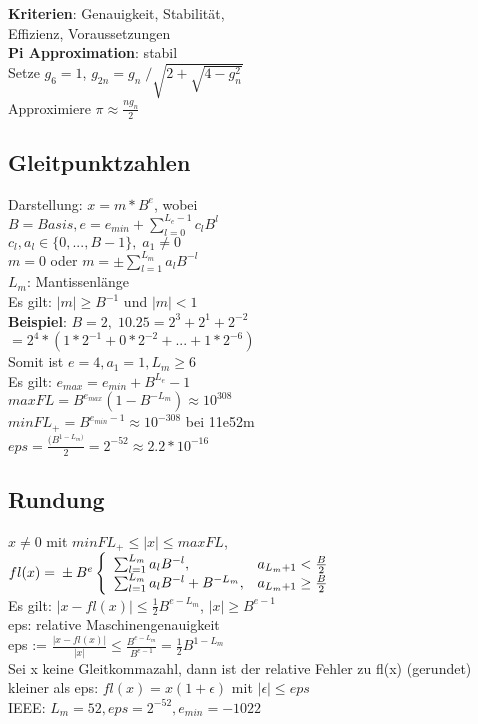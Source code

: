 \textbf{Kriterien}: Genauigkeit, Stabilität,\\
Effizienz, Voraussetzungen\\
\textbf{Pi Approximation}: stabil\\
Setze $g_{6} = 1$, $g_{2n} = g_{n} \;/ \sqrt{2 +  \sqrt{4 - g_{n}^{2}}}$\\
Approximiere $\pi \approx \frac{ng_{n}}{2}$
\subsection{Gleitpunktzahlen}
Darstellung: $x = m * B^{e}$, wobei\\
$B = Basis, e = e_{min} + \sum_{l=0}^{L_{e}-1} c_{l}B^{l}$\\
$c_{l}, a_{l} \in \{0, ..., B-1\},\; a_{1} \neq 0$\\
$m = 0$ oder $ m = \pm \sum_{l=1}^{L_{m}} a_{l}B^{-l} $\\
$L_{m}$: Mantissenlänge\\
Es gilt: $|m| \geq B^{-1}$ und $|m| < 1$\\
\textbf{Beispiel}: $B = 2, \; 10.25 = 2^3 + 2^1 + 2^{-2}$\\
$ = 2^4 * (1*2^{-1} + 0*2^{-2} + ... + 1*2^{-6})$\\
Somit ist $ e = 4, a_{1} = 1, L_{m} \geq 6$\\
Es gilt: $e_{max} = e_{min} + B^{L_e} -1$\\
$maxFL = B^{e_{max}}(1-B^{-L_m}) \approx 10^{308}$\\
$minFL_+ = B^{e_{min}-1} \approx 10^{-308}$ bei 11e52m\\
$eps = \frac{(B^{1-L_m)}}{2} = 2^{-52} \approx 2.2 * 10^{-16}$
\subsection{Rundung}
$x \neq 0$ mit $minFL_+ \leq |x| \leq maxFL$, $fl(x) =\\ \pm B^e\left\{
\begin{array}{ll}
\sum_{l=1}^{L_{m}} a_{l}B^{-l}, & a_{L_m+1} < \frac{B}{2} \\
\sum_{l=1}^{L_{m}} a_{l}B^{-l} + B^{-L_m}, & a_{L_m+1} \geq \frac{B}{2} \\
\end{array}
\right. $\\
Es gilt: $|x - fl(x)| \leq \frac{1}{2}B^{e-L_m}$, $|x| \geq B^{e-1}$\\
eps: relative Maschinengenauigkeit\\
eps := $\frac{|x - fl(x)|}{|x|} \leq \frac{B^{e-L_m}}{B^{e-1}} = \frac{1}{2}B^{1-L_m}$\\
Sei x keine Gleitkommazahl, dann ist der relative Fehler zu fl(x) (gerundet) kleiner als eps: $fl(x) = x(1+\epsilon)$ mit $|\epsilon| \leq eps$\\
IEEE: $L_m = 52, eps = 2^{-52}, e_{min} = -1022$

